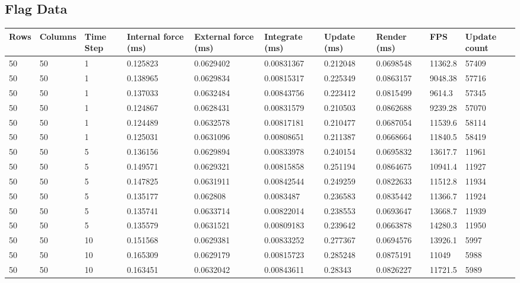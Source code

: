 \begin{landscape}
\subsection{Flag Data}

\begin{longtable}{ | l | l | l | l | l | l | l | l | l | l | }
\hline
 Rows &  Columns &  Time Step &  Internal force (ms) &  External force (ms) &  Integrate (ms) &  Update (ms) &  Render (ms) &  FPS &  Update count \\ \hline
50 & 50 & 1 & 0.125823 & 0.0629402 & 0.00831367 & 0.212048 & 0.0698548 & 11362.8 & 57409\\ \hline
50 & 50 & 1 & 0.138965 & 0.0629834 & 0.00815317 & 0.225349 & 0.0863157 & 9048.38 & 57716\\ \hline
50 & 50 & 1 & 0.137033 & 0.0632484 & 0.00843756 & 0.223412 & 0.0815499 & 9614.3 & 57345\\ \hline
50 & 50 & 1 & 0.124867 & 0.0628431 & 0.00831579 & 0.210503 & 0.0862688 & 9239.28 & 57070\\ \hline
50 & 50 & 1 & 0.124489 & 0.0632578 & 0.00817181 & 0.210477 & 0.0687054 & 11539.6 & 58114\\ \hline
50 & 50 & 1 & 0.125031 & 0.0631096 & 0.00808651 & 0.211387 & 0.0668664 & 11840.5 & 58419\\ \hline
50 & 50 & 5 & 0.136156 & 0.0629894 & 0.00833978 & 0.240154 & 0.0695832 & 13617.7 & 11961\\ \hline
50 & 50 & 5 & 0.149571 & 0.0629321 & 0.00815858 & 0.251194 & 0.0864675 & 10941.4 & 11927\\ \hline
50 & 50 & 5 & 0.147825 & 0.0631911 & 0.00842544 & 0.249259 & 0.0822633 & 11512.8 & 11934\\ \hline
50 & 50 & 5 & 0.135177 & 0.062808 & 0.0083487 & 0.236583 & 0.0835442 & 11366.7 & 11924\\ \hline
50 & 50 & 5 & 0.135741 & 0.0633714 & 0.00822014 & 0.238553 & 0.0693647 & 13668.7 & 11939\\ \hline
50 & 50 & 5 & 0.135579 & 0.0631521 & 0.00809183 & 0.239642 & 0.0663878 & 14280.3 & 11950\\ \hline
50 & 50 & 10 & 0.151568 & 0.0629381 & 0.00833252 & 0.277367 & 0.0694576 & 13926.1 & 5997\\ \hline
50 & 50 & 10 & 0.165309 & 0.0629179 & 0.00815723 & 0.285248 & 0.0875191 & 11049 & 5988\\ \hline
50 & 50 & 10 & 0.163451 & 0.0632042 & 0.00843611 & 0.28343 & 0.0826227 & 11721.5 & 5989\\ \hline

\end{longtable}
\end{landscape}
